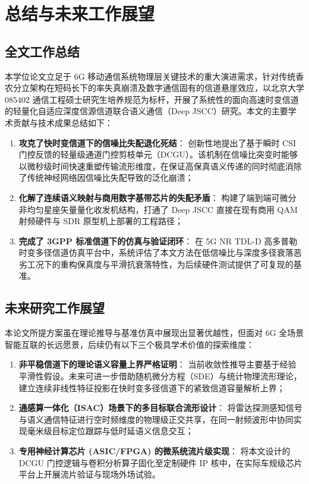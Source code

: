 \chapter{总结与未来工作展望}
\label{chap:conclusion}

\section{全文工作总结}
本学位论文立足于 6G 移动通信系统物理层关键技术的重大演进需求，针对传统香农分立架构在短码长下的率失真崩溃及数字通信固有的信道悬崖效应，以北京大学 085402 通信工程硕士研究生培养规范为标杆，开展了系统性的面向高速时变信道的轻量化自适应深度信源信道联合语义通信（Deep JSCC）研究。本文的主要学术贡献与技术成果总结如下：
\begin{enumerate}
  \item \textbf{攻克了快时变信道下的信噪比失配退化死结}：
  创新性地提出了基于瞬时 CSI 门控反馈的轻量级通道门控剪枝单元（DCGU）。该机制在信噪比突变时能够以微秒级时间快速重塑传输流形维度，在保证高保真语义传递的同时彻底消除了传统神经网络因信噪比失配导致的泛化崩溃；
  \item \textbf{化解了连续语义映射与商用数字基带芯片的失配矛盾}：
  构建了端到端可微分非均匀星座矢量量化收发机结构，打通了 Deep JSCC 直接在现有商用 QAM 射频硬件与 SDR 原型机上部署的工程路径；
  \item \textbf{完成了 3GPP 标准信道下的仿真与验证闭环}：
  在 5G NR TDL-D 高多普勒时变多径信道仿真平台中，系统评估了本文方法在低信噪比与深度多径衰落恶劣工况下的重构保真度与平滑抗衰落特性，为后续硬件测试提供了可复现的基准。
\end{enumerate}

\section{未来研究工作展望}
本论文所提方案虽在理论推导与基准仿真中展现出显著优越性，但面对 6G 全场景智能互联的长远愿景，后续仍有以下三个极具学术价值的探索维度：
\begin{enumerate}
  \item \textbf{非平稳信道下的理论语义容量上界严格证明}：
  当前收敛性推导主要基于经验平滑性假设。未来可进一步借助随机微分方程（SDE）与统计物理流形理论，建立连续非线性特征投影在快时变多径信道下的紧致信道容量解析上界；
  \item \textbf{通感算一体化（ISAC）场景下的多目标联合流形设计}：
  将雷达探测感知信号与语义通信特征进行空时频维度的物理级正交共享，在同一射频波形中协同实现毫米级目标定位跟踪与低时延语义信息交互；
  \item \textbf{专用神经计算芯片 (ASIC/FPGA) 的微系统流片级实现}：
  将本文设计的 DCGU 门控逻辑与卷积分析算子固化至定制硬件 IP 核中，在实际车规级芯片平台上开展流片验证与现场外场试验。
\end{enumerate}
